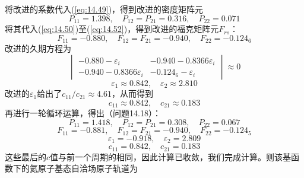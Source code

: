 \begin{examplebox}
        将改进的系数代入(\ref{eq:14.49})，得到改进的密度矩阵元
        \begin{equation*}
            P_{11} = 1.398, \quad P_{12} = P_{21} = 0.316, \quad P_{22} = 0.071
        \end{equation*}
        将其代入(\ref{eq:14.50})至(\ref{eq:14.52})，得到改进的福克矩阵元$F_{rs}$：
        \begin{equation*}
            F_{11} = -0.880, \quad F_{12} = F_{21} = -0.940, \quad F_{22} = -0.124_6
        \end{equation*}
        改进的久期方程为
        \begin{equation*}
            \begin{vmatrix}
                -0.880 - \varepsilon_i & -0.940 - 0.8366 \varepsilon_i \\
                -0.940 - 0.8366 \varepsilon_i & -0.124_6 - \varepsilon_i
            \end{vmatrix} \approx 0
        \end{equation*}
        \begin{equation*}
            \varepsilon_1 \approx 0.842, \quad \varepsilon_2 \approx 2.810
        \end{equation*}
        改进的$\varepsilon_1$给出了$c_{11} / c_{21} \approx 4.61$，从而得到
        \begin{equation*}
            c_{11} \approx 0.842, \quad c_{21} \approx 0.183
        \end{equation*}
        再进行一轮循环运算，得出（问题14.18）：
        \begin{equation*}
            P_{11} = 1.418, \quad P_{12} = P_{21} = 0.308, \quad P_{22} = 0.067
        \end{equation*}
        \begin{equation}
            F_{11} = -0.881, \quad F_{12} = F_{21} = -0.940, \quad F_{22} = -0.124_5
            \label{eq:14.53}
        \end{equation}
        \begin{equation}
            \varepsilon_1 = -0.918, \quad \varepsilon_2 = 2.809
            \label{eq:14.54}
        \end{equation}
        \begin{equation*}
            c_{11} = 0.842, \quad c_{21} = 0.183
        \end{equation*}
        这些最后的$c$值与前一个周期的相同，因此计算已收敛，我们完成计算。则该基函数下的氦原子基态自洽场原子轨道为
        \begin{equation*}

\end{equation*}
\end{examplebox}
